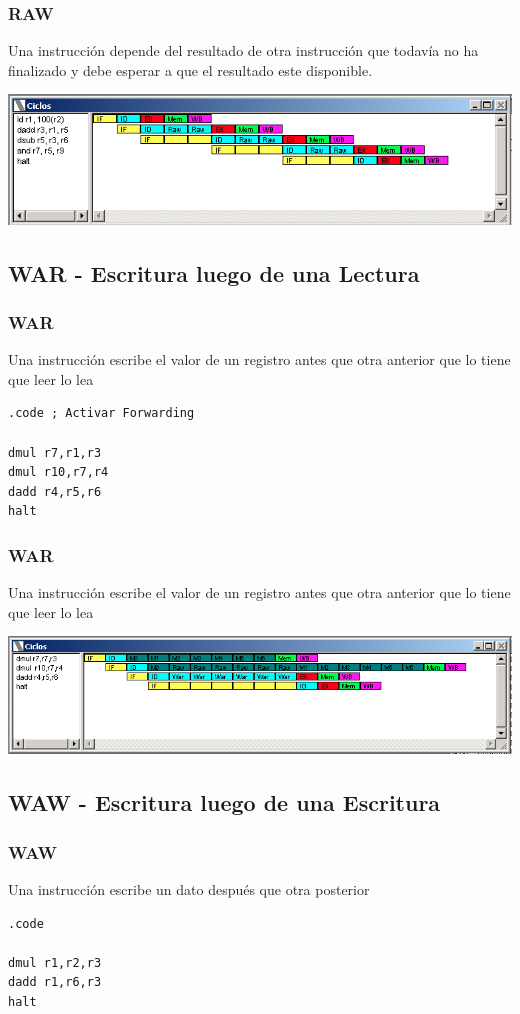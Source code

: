 \documentclass{beamer}
\begin{document}
\begin{frame}[fragile]
\frametitle{RAW}
Una instrucción depende del resultado de otra instrucción que todavía no ha finalizado y debe esperar a que el resultado este disponible.
\begin{block}{}
\includegraphics[scale=0.45]{raw.png}
\end{block}

\end{frame}


\subsection{WAR - Escritura luego de una Lectura}
\begin{frame}[fragile]
\frametitle{WAR}
Una instrucción escribe el valor de un registro antes que otra anterior que lo tiene que leer lo lea
\begin{block}{}
\begin{lstlisting}[basicstyle=\ttfamily,keywordstyle=\color{blue}]
.code ; Activar Forwarding

dmul r7,r1,r3
dmul r10,r7,r4
dadd r4,r5,r6
halt
\end{lstlisting}
\end{block}

\end{frame}


\begin{frame}[fragile]
\frametitle{WAR}
Una instrucción escribe el valor de un registro antes que otra anterior que lo tiene que leer lo lea
\begin{block}{}
\includegraphics[scale=0.45]{war.png}
\end{block}
\end{frame}


\subsection{WAW - Escritura luego de una Escritura}
\begin{frame}[fragile]
\frametitle{WAW}
Una instrucción escribe un dato después que otra posterior
\begin{block}{}
\begin{lstlisting}[basicstyle=\ttfamily,keywordstyle=\color{blue}]
.code

dmul r1,r2,r3
dadd r1,r6,r3
halt
\end{lstlisting}
\end{block}

\end{frame}
\end{document}
